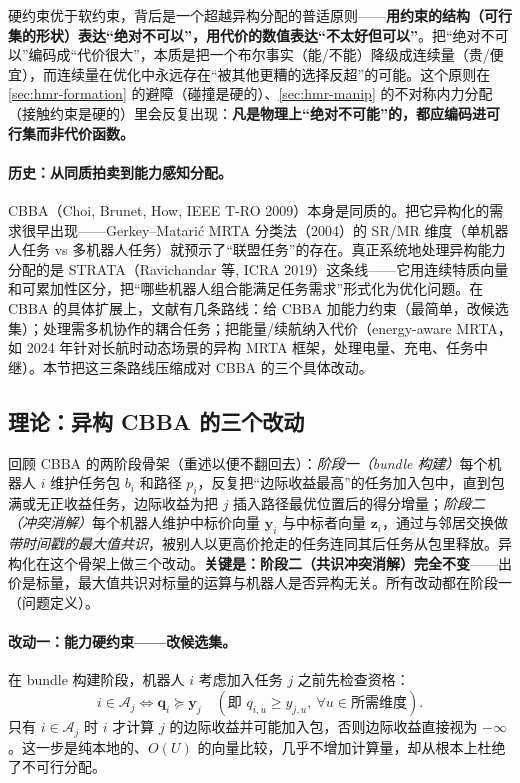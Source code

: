 \begin{insight}
硬约束优于软约束，背后是一个超越异构分配的普适原则——\textbf{用约束的结构（可行集的形状）表达“绝对不可以”，用代价的数值表达“不太好但可以”}。把“绝对不可以”编码成“代价很大”，本质是把一个布尔事实（能/不能）降级成连续量（贵/便宜），而连续量在优化中永远存在“被其他更糟的选择反超”的可能。这个原则在 \cref{sec:hmr-formation} 的避障（碰撞是硬的）、\cref{sec:hmr-manip} 的不对称内力分配（接触约束是硬的）里会反复出现：\textbf{凡是物理上“绝对不可能”的，都应编码进可行集而非代价函数。}
\end{insight}

\paragraph{历史：从同质拍卖到能力感知分配。}
CBBA（Choi, Brunet, How, IEEE T-RO 2009\cite{choi2009cbba}）本身是同质的。把它异构化的需求很早出现——Gerkey--Matari\'c MRTA 分类法（2004）的 SR/MR 维度（单机器人任务 vs 多机器人任务）就预示了“联盟任务”的存在。真正系统地处理异构能力分配的是 STRATA（Ravichandar 等, ICRA 2019\cite{ravichandar2019strata}）这条线——它用连续特质向量和可累加性区分，把“哪些机器人组合能满足任务需求”形式化为优化问题。在 CBBA 的具体扩展上，文献有几条路线：给 CBBA 加能力约束（最简单，改候选集）；处理需多机协作的耦合任务；把能量/续航纳入代价（energy-aware MRTA，如 2024 年针对长航时动态场景的异构 MRTA 框架\cite{hmrta2024longendurance}，处理电量、充电、任务中继）。本节把这三条路线压缩成对 CBBA 的三个具体改动。

\subsection{理论：异构 CBBA 的三个改动}
\label{sec:hmr-cbba-three}
回顾 CBBA 的两阶段骨架（重述以便不翻回去）：\emph{阶段一（bundle 构建）}每个机器人 $i$ 维护任务包 $b_i$ 和路径 $p_i$，反复把“边际收益最高”的任务加入包中，直到包满或无正收益任务，边际收益为把 $j$ 插入路径最优位置后的得分增量；\emph{阶段二（冲突消解）}每个机器人维护中标价向量 $\mathbf{y}_i$ 与中标者向量 $\mathbf{z}_i$，通过与邻居交换做\emph{带时间戳的最大值共识}，被别人以更高价抢走的任务连同其后任务从包里释放。异构化在这个骨架上做三个改动。\textbf{关键是：阶段二（共识冲突消解）完全不变}——出价是标量，最大值共识对标量的运算与机器人是否异构无关。所有改动都在阶段一（问题定义）。

\paragraph{改动一：能力硬约束——改候选集。}
在 bundle 构建阶段，机器人 $i$ 考虑加入任务 $j$ 之前先检查资格：
\begin{equation}
  i\in\mathcal{A}_j \iff \mathbf{q}_i\succeq\mathbf{y}_j\quad(\text{即 }q_{i,u}\ge y_{j,u},\ \forall u\in\text{所需维度}).
  \label{eq:hmr-eligible}
\end{equation}
只有 $i\in\mathcal{A}_j$ 时 $i$ 才计算 $j$ 的边际收益并可能加入包，否则边际收益直接视为 $-\infty$。这一步是纯本地的、$O(U)$ 的向量比较，几乎不增加计算量，却从根本上杜绝了不可行分配。

